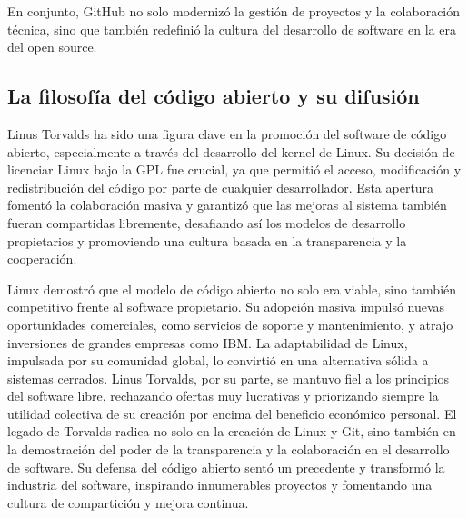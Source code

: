\documentclass[a4paper,12pt]{article}
\begin{document}
En conjunto, GitHub no solo modernizó la gestión de proyectos y la colaboración
técnica, sino que también redefinió la cultura del desarrollo de software en la
era del open source.

\subsection{La filosofía del código abierto y su difusión} 

Linus Torvalds ha sido una figura clave en la promoción del software de código
abierto, especialmente a través del desarrollo del kernel de Linux. Su decisión
de licenciar Linux bajo la GPL fue crucial, ya que permitió el acceso,
modificación y redistribución del código por parte de cualquier desarrollador.
Esta apertura fomentó la colaboración masiva y garantizó que las mejoras al
sistema también fueran compartidas libremente, desafiando así los modelos de
desarrollo propietarios y promoviendo una cultura basada en la transparencia y
la cooperación.

Linux demostró que el modelo de código abierto no solo era viable, sino también
competitivo frente al software propietario. Su adopción masiva impulsó nuevas
oportunidades comerciales, como servicios de soporte y mantenimiento, y atrajo
inversiones de grandes empresas como IBM. La adaptabilidad de Linux, impulsada
por su comunidad global, lo convirtió en una alternativa sólida a sistemas
cerrados. Linus Torvalds, por su parte, se mantuvo fiel a los principios del
software libre, rechazando ofertas muy lucrativas y priorizando siempre la utilidad
colectiva de su creación por encima del beneficio económico personal. 
El legado de Torvalds radica no solo en la creación de Linux y Git, sino también en la
demostración del poder de la transparencia y la colaboración en el desarrollo de
software. Su defensa del código abierto sentó un precedente y transformó la
industria del software, inspirando innumerables proyectos y fomentando una
cultura de compartición y mejora continua. 

\newpage
\end{document}
